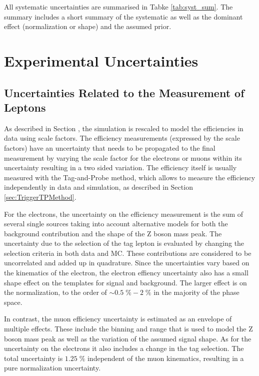 All systematic uncertainties are summarised in Tabke \ref{tab:syst_sum}. The summary includes a short summary of the systematic as well as the dominant effect (normalization or shape) and
the assumed prior.

\section{Experimental Uncertainties}
\label{sec:exp_uncert}

\subsection{Uncertainties Related to the Measurement of  Leptons}

As described in Section , the simulation is rescaled to model the efficiencies in data using scale factors. The efficiency measurements (expressed by the scale factors) have an uncertainty that needs to be propagated to the final measurement by varying the scale factor for the electrons or muons within its uncertainty resulting in a two sided variation.
The efficiency itself is usually measured with the Tag-and-Probe method, which allows to measure the efficiency independently in data and simulation, as described in Section \ref{sec:TriggerTPMethod}.

For the electrons, the uncertainty on the efficiency measurement is the sum of several single sources taking into account alternative models for both the background contribution
and the shape of the Z boson mass peak.
The uncertainty due to the selection of the tag lepton is evaluated by changing the selection criteria in both data and MC.
These contributions are considered to be uncorrelated and added up in quadrature. 
Since the uncertainties vary based on the kinematics of the electron, the electron effiency uncertainty also has a small shape effect on the templates for signal and background. The larger effect
is on the normalization, to the order of $\sim 0.5 \; \% - 2\; \%$ in the majority of the phase space.

In contrast, the muon efficiency uncertainty is estimated as an envelope of multiple effects. These include the binning and range that is used to model the Z boson mass peak as well as the variation of the assumed signal shape. As for the uncertainty on the electrons it also includes a change in the tag selection.
The total uncertainty is $1.25 \; \%$ independent of the muon kinematics, resulting in a pure normalization uncertainty.

